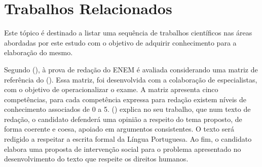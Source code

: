 \section{Trabalhos Relacionados}
\label{section:trabalhos_relacionados}

Este tópico é destinado a listar uma sequência de trabalhos científicos nas 
áreas abordadas por este estudo com o objetivo de adquirir conhecimento para a
elaboração do mesmo.

Segundo  (\citeyear{silvio_taynan:2017}), 
à prova de redação do ENEM é avaliada considerando uma matriz de referência 
do \citeauthor{edital_enem:2016} (\citeyear{edital_enem:2016}). Essa matriz, 
foi desenvolvida com a colaboração de especialistas, com o objetivo de 
operacionalizar o exame. A matriz apresenta cinco competências, para cada 
competência expressa para redação existem níveis de conhecimento associados de 
0 a 5.  (\citeyear{braga:2015}) explica no seu 
trabalho, que num texto de redação, o candidato defenderá uma opinião a 
respeito do tema proposto, de forma coerente e coesa, apoiado em argumentos 
consistentes. O texto será redigido a respeitar a escrita formal da Língua 
Portuguesa. Ao fim, o candidato elabora uma proposta de intervenção social para 
o problema apresentado no desenvolvimento do texto que respeite os direitos 
humanos.

